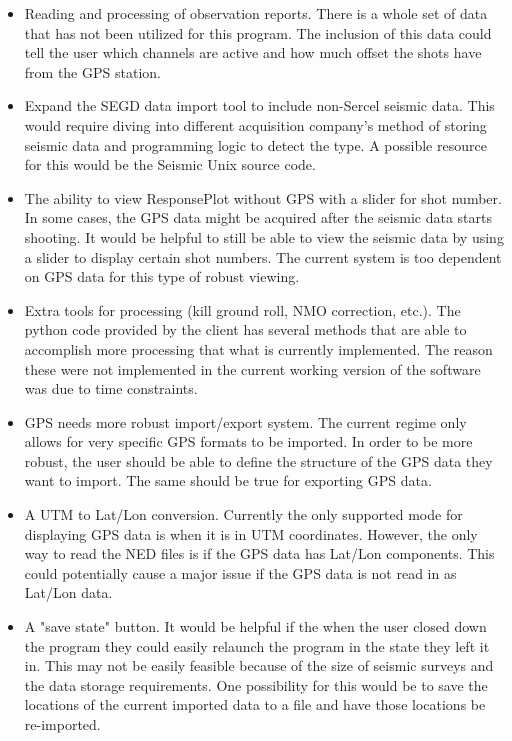 \documentclass[12pt]{article}
\begin{document}
\begin{itemize}

\item Reading and processing of observation reports. There is a whole set of data that has not been utilized for this program. The inclusion of this data could tell the user which channels are active and how much offset the shots have from the GPS station.

\item Expand the SEGD data import tool to include non-Sercel seismic data. This would require diving into different acquisition company's method of storing seismic data and programming logic to detect the type. A possible resource for this would be the Seismic Unix source code.

\item The ability to view ResponsePlot without GPS with a slider for shot number. In some cases, the GPS data might be acquired after the seismic data starts shooting. It would be helpful to still be able to view the seismic data by using a slider to display certain shot numbers. The current system is too dependent on GPS data for this type of robust viewing.

\item Extra tools for processing (kill ground roll, NMO correction, etc.). The python code provided by the client has several methods that are able to accomplish more processing that what is currently implemented. The reason these were not implemented in the current working version of the software was due to time constraints.

\item GPS needs more robust import/export system. The current regime only allows for very specific GPS formats to be imported. In order to be more robust, the user should be able to define the structure of the GPS data they want to import. The same should be true for exporting GPS data.

\item A UTM to Lat/Lon conversion. Currently the only supported mode for displaying GPS data is when it is in UTM coordinates. However, the only way to read the NED files is if the GPS data has Lat/Lon components. This could potentially cause a major issue if the GPS data is not read in as Lat/Lon data. 

\item A "save state" button. It would be helpful if the when the user closed down the program they could easily relaunch the program in the state they left it in. This may not be easily feasible because of the size of seismic surveys and the data storage requirements. One possibility for this would be to save the locations of the current imported data to a file and have those locations be re-imported.


\end{itemize}
\end{document}
